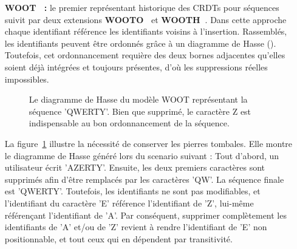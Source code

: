 \begin{itemize}
\item [\textbf{WOOT~\cite{oster2006data} :}] le premier représentant historique
  des CRDTs pour séquences suivit par deux extensions
  \textbf{WOOTO~\cite{weiss2007wooki}} et
  \textbf{WOOTH~\cite{ahmed2011evaluating}}. Dans cette approche chaque
  identifiant référence les identifiants voisins à l'insertion. Rassemblés, les
  identifiants peuvent être ordonnés grâce à un diagramme de Hasse
  (\REF). Toutefois, cet ordonnancement requière des deux bornes adjacentes
  qu'elles soient déjà intégrées et toujours présentes, d'où les suppressions
  réelles impossibles.

  \begin{figure}
    \centering
    
    \caption{\label{repl:fig:wootexample}Le diagramme de Hasse du modèle WOOT
      représentant la séquence 'QWERTY'. Bien que supprimé, le caractère Z est
      indispensable au bon ordonnancement de la séquence.}
  \end{figure}

  La figure~\ref{repl:fig:wootexample} illustre la nécessité de conserver les
  pierres tombales. Elle montre le diagramme de Hasse généré lors du scenario
  suivant : Tout d'abord, un utilisateur écrit 'AZERTY'. Ensuite, les deux
  premiers caractères sont supprimés afin d'être remplacés par les caractères
  'QW'. La séquence finale est 'QWERTY'. Toutefois, les identifiants ne sont pas
  modifiables, et l'identifiant du caractère 'E' référence l'identifiant de 'Z',
  lui-même référençant l'identifiant de 'A'. Par conséquent, supprimer
  complètement les identifiants de 'A' et/ou de 'Z' revient à rendre
  l'identifiant de 'E' non positionnable, et tout ceux qui en dépendent par
  transitivité.


\end{itemize}
